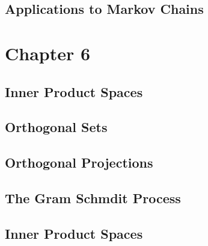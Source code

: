 \documentclass{article}
\begin{document}
\subsection{Applications to Markov Chains}
\section{Chapter 6}
\subsection{Inner Product Spaces}
\subsection{Orthogonal Sets}
\subsection{Orthogonal Projections}
\subsection{The Gram Schmdit Process}
\subsection{Inner Product Spaces}




\pagebreak
\end{document}
